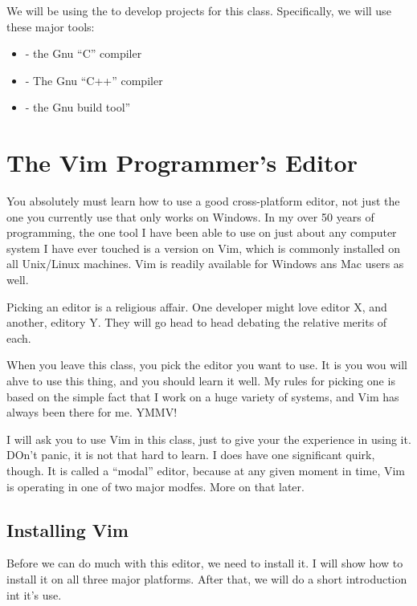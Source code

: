 \documentclass[letterpaper,11pt,english]{sphinxmanual}
\begin{document}
We will be using the  to develop projects for
this class. Specifically, we will use these major tools:
\begin{itemize}
\item {} 
 - the Gnu “C” compiler

\item {} 
 - The Gnu “C++” compiler

\item {} 
 - the Gnu build tool”

\end{itemize}


\chapter{The Vim Programmer’s Editor}
\label{\detokenize{appendix/vim-introduction::doc}}\label{\detokenize{appendix/vim-introduction:the-vim-programmer-s-editor}}
You absolutely must learn how to use a good cross-platform editor, not just the
one you currently use that only works on Windows. In my over 50 years of
programming, the one tool I have been able to use on just about any computer
system I have ever touched is a version on Vim, which is commonly installed on
all Unix/Linux machines. Vim is readily available for Windows ans Mac users as
well.

Picking an editor is a religious affair. One developer might love editor X, and another, editory Y. They will go head to head debating the relative merits of each.

When you leave this class, you pick the editor you want to use. It is you wou will ahve to use this thing, and you should learn it well. My rules for picking one is based on the simple fact that I work on a huge variety of systems, and Vim has always been there for me. YMMV!

I will ask you to use Vim in this class, just to give your the experience in using it. DOn’t panic, it is not that hard to learn. I does have one significant quirk, though. It is called a “modal” editor, because at any given moment in time, Vim is operating in one of two major modfes. More on that later.


\section{Installing Vim}
\label{\detokenize{appendix/vim-introduction:installing-vim}}
Before we can do much with this editor, we need to install it. I will show how
to install it on all three major platforms. After that, we will do a short
introduction int it’s use.
\end{document}
